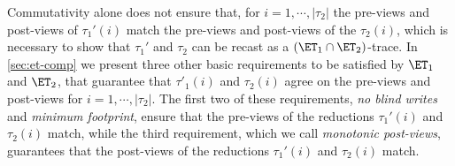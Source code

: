 Commutativity alone does not ensure that, for $i=1,\cdots,\lvert \tau_2 \rvert$ the 
pre-views and post-views of $\tau_1'(i)$ 
match the pre-views and post-views of the $\tau_2(i)$, which is necessary to show 
that $\tau_1'$ and $\tau_2$ can be recast as a $(\ET_1 \cap \ET_2)$-trace. 
In \cref{sec:et-comp} we present three other basic requirements to be 
satisfied by $\ET_1$ and $\ET_2$, that guarantee that $\tau'_1(i)$ and 
$\tau_2(i)$ agree on the pre-views and post-views for $i=1,\cdots, \lvert \tau_2 \rvert$. 
The first two of these requirements,  \emph{no blind writes} and \emph{minimum footprint}, 
ensure that the pre-views of the reductions $\tau_1'(i)$ and $\tau_2(i)$ match, 
while the third requirement, which we call \emph{monotonic post-views}, 
guarantees that the post-views of the reductions $\tau_1'(i)$ and $\tau_2(i)$ 
match. 
%
%
%
%
